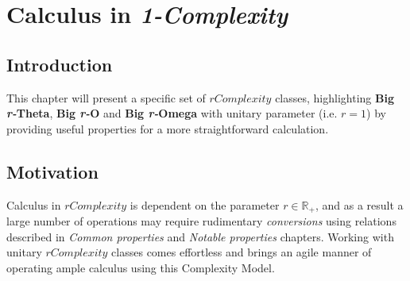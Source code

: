 
\chapter{Calculus in {\textit{1-Complexity}} }




\section{Introduction}
This chapter will present a specific set of $rComplexity$ classes, highlighting \textbf{Big \textit{r-}Theta}, \textbf{Big \textit{r-}O} and \textbf{Big \textit{r-}Omega} with unitary parameter (i.e. $r = 1$) by providing useful properties for a more straightforward calculation. 

\section{Motivation}
Calculus in $rComplexity$ is dependent on the parameter $r \in \mathbb{R}_{+}$, and as a result a large number of operations may require rudimentary \textit{conversions} using relations described in \textit{Common properties} and \textit{Notable properties} chapters. Working with unitary $rComplexity$ classes comes effortless and brings an agile manner of operating ample
calculus using this Complexity Model.

